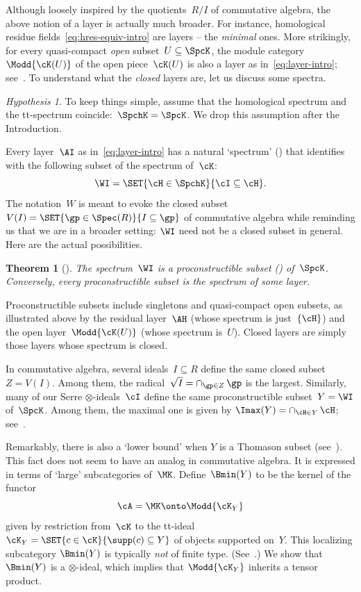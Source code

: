 \documentclass[11pt]{amsart}
\numberwithin{equation}{section} %
\theoremstyle{plain}
\newtheorem{thm}[equation]{Theorem}
\theoremstyle{definition}
\theoremstyle{remark}
\newtheorem{hyp}[equation]{Hypothesis}
\begin{document}
Although loosely inspired by the quotients~$R/I$ of commutative algebra, the above notion of a layer is actually much broader.
For instance, homological residue fields~\eqref{eq:hres-equiv-intro} are layers -- the \emph{minimal} ones.
More strikingly, for every quasi-compact \emph{open} subset~$U\subseteq \SpcK$, the module category~$\Modd{\cK(U)}$ of the open piece~$\cK(U)$ is also a layer as in~\eqref{eq:layer-intro}; see~\cite[Proposition~2.9]{Balmer20a}. To understand what the \emph{closed} layers are, let us discuss some spectra.

\begin{hyp}
\label{hyp-steel}%
To keep things simple, assume that the homological spectrum and the tt-spectrum coincide:~$\SpchK=\SpcK$. We drop this assumption after the Introduction.
\end{hyp}

Every layer~$\AI$ as in~\eqref{eq:layer-intro} has a natural `spectrum' () that identifies with the following subset of the spectrum of~$\cK$:
%
\begin{equation}
\label{eq:spc(AI)-intro}%
\WI=\SET{\cH\in\SpchK}{\cI\subseteq \cH}.
\end{equation}
%
The notation~$W$ is meant to evoke the closed subset~$V(I)=\SET{\gp\in\Spec(R)}{I\subseteq \gp}$ of commutative algebra while reminding us that we are in a broader setting: $\WI$ need not be a closed subset in general. Here are the actual possibilities.
%
\begin{thm}[{}]
\label{thm:procon-intro}%
The spectrum~$\WI$ is a proconstructible subset () of~$\SpcK$. Conversely, every proconstructible subset is the spectrum of some layer.
\end{thm}
%
Proconstructible subsets include singletons and quasi-compact open subsets, as illustrated above by the residual layer~$\AH$ (whose spectrum is just~$\{\cH\}$) and the open layer~$\Modd{\cK(U)}$ (whose spectrum is~$U$).
Closed layers are simply those layers whose spectrum is closed.

In commutative algebra, several ideals~$I\subseteq R$ define the same closed subset~$Z=V(I)$. Among them, the radical~$\sqrt{I}=\cap_{\gp\in Z}\,\gp$ is the largest.
Similarly, many of our Serre $\otimes$-ideals~$\cI$ define the same proconstructible subset~$Y=\WI$ of~$\SpcK$. 
Among them, the maximal one is given by $\Imax(Y)=\cap_{\cH\in Y}\,\cH$; see~.

Remarkably, there is also a `lower bound' when $Y$ is a Thomason subset (see~). This fact does not seem to have an analog in commutative algebra. It is expressed in terms of `large' subcategories of~$\MK$.
Define~$\Bmin(Y)$ to be the kernel of the functor
%
\[
 \cA=\MK\onto \Modd{\cK_Y}
\]
%
given by restriction from~$\cK$ to the tt-ideal~$\cK_Y=\SET{c\in\cK}{\supp(c)\subseteq Y}$ of objects supported on~$Y$. This localizing subcategory $\Bmin(Y)$ is typically \emph{not} of finite type. (See~.) We show that $\Bmin(Y)$ is a $\otimes$-ideal, which implies that $\Modd{\cK_Y}$ inherits a tensor product.
\end{document}

